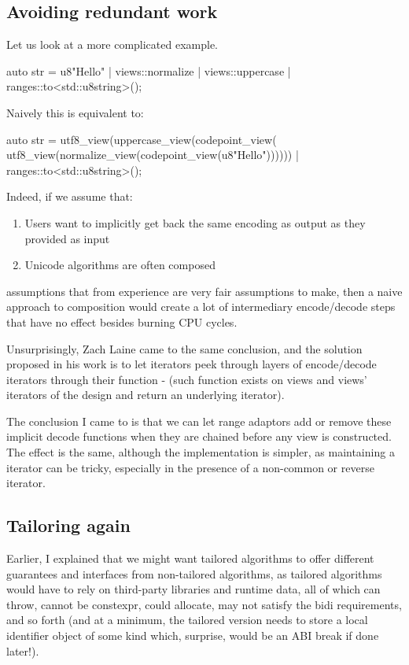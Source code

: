 \documentclass{wg21}
\begin{document}
\subsection{Avoiding redundant work}

Let us look at a more complicated example.

\begin{colorblock}
auto str = u8"Hello" | views::normalize | views::uppercase | ranges::to<std::u8string>();
\end{colorblock}

Naively this is equivalent to:

\begin{colorblock}
auto str = utf8_view(uppercase_view(codepoint_view(
           utf8_view(normalize_view(codepoint_view(u8"Hello"))))))
          | ranges::to<std::u8string>();
\end{colorblock}


Indeed, if we assume that:
\begin{enumerate}
\item Users want to implicitly get back the same encoding as output as they provided as input
\item Unicode algorithms are often composed
\end{enumerate}

assumptions that from experience are very fair assumptions to make, then a naive approach to composition would create a lot of intermediary encode/decode steps that have no effect besides burning CPU cycles.

Unsurprisingly, Zach Laine came to the same conclusion, and the solution proposed in his work is to let iterators peek through layers of encode/decode iterators through their  function - (such function exists on views and views' iterators of the  design and return an underlying iterator).

The conclusion I came to is that we can let range adaptors add or remove these implicit decode functions when they are chained before any view is constructed.
The effect is the same, although the implementation is simpler, as maintaining a  iterator can be tricky, especially in the presence of a non-common or reverse iterator.

\subsection{Tailoring again}

Earlier, I explained that we might want tailored algorithms to offer different guarantees and interfaces from non-tailored algorithms,
as tailored algorithms would have to rely on third-party libraries and runtime data, all of which can throw, cannot be constexpr, could allocate, may not satisfy the bidi requirements, and so forth (and at a minimum, the tailored version needs to store a local identifier object of some kind which, surprise, would be an ABI break if done later!).
\end{document}
